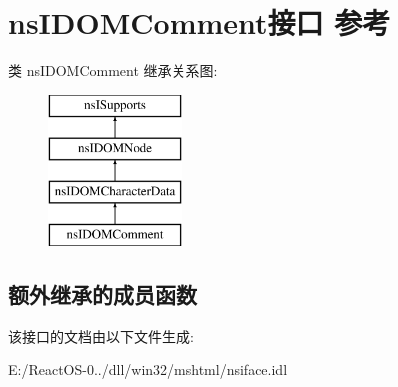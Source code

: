 \hypertarget{interfacens_i_d_o_m_comment}{}\section{ns\+I\+D\+O\+M\+Comment接口 参考}
\label{interfacens_i_d_o_m_comment}
类 ns\+I\+D\+O\+M\+Comment 继承关系图\+:\begin{figure}[H]
\begin{center}
\leavevmode
\includegraphics[height=4.000000cm]{interfacens_i_d_o_m_comment}
\end{center}
\end{figure}
\subsection*{额外继承的成员函数}


该接口的文档由以下文件生成\+:\begin{DoxyCompactItemize}
\item 
E\+:/\+React\+O\+S-\/0../dll/win32/mshtml/nsiface.\+idl\end{DoxyCompactItemize}
